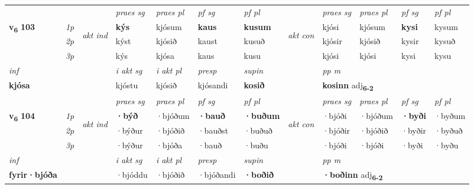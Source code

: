 \begin{longtable}[l]{X>{\footnotesize\itshape}llXXXXlXXXX}
 & &   & \textit{praes sg}  & \textit{praes pl}    & \textit{ pf sg} & \textit{pf pl} & & \textit{praes sg}  & \textit{praes pl}    & \textit{pf sg} & \textit{pf pl }  \\ \cmidrule{4-7} \cmidrule{9-12}
 \multirow{2}{*}{{{\textbf{v{\textsubscript{6}}} \Large{\textbf{103}}}}}  & 1p & \multirow{3}{*}{\begin{turn}{90}\textit{akt ind}\end{turn}} & \textbf{kýs} & kjósum & \textbf{kaus} & \textbf{kusum} & \multirow{3}{*}{\begin{turn}{90}\textit{akt con}\end{turn}} &kjósi & kjósum & \textbf{kysi} & kysum\\*
 & 2p &  &  kýst  & kjósið & kaust & kusuð & & kjósir & kjósið & kysir & kysuð \\*
 & 3p &  & kýs & kjósa & kaus & kusu & & kjósi & kjósi& kysi & kysu \\*
\cmidrule{4-7} \cmidrule{9-12}

   {\textit{inf}} & &  & \textit{i akt sg} & \textit{i akt pl}   & \textit{presp} & \textit{supin}  && \textit{pp m} \\*
  {\textbf{kjósa}} & && kjóstu  & kjósið   & kjósandi &  \textbf{kosið}  && \multicolumn{2}{l}{\textbf{kosinn} adj\textbf{\textsubscript{6-2}}} \\*

\midrule

 & &   & \textit{praes sg}  & \textit{praes pl}    & \textit{ pf sg} & \textit{pf pl} & & \textit{praes sg}  & \textit{praes pl}    & \textit{pf sg} & \textit{pf pl }  \\ \cmidrule{4-7} \cmidrule{9-12}
 \multirow{2}{*}{{{\textbf{v{\textsubscript{6}}} \Large{\textbf{104}}}}}  & 1p & \multirow{3}{*}{\begin{turn}{90}\textit{akt ind}\end{turn}} & \textbf{·býð} & ·bjóðum & \textbf{·bauð} & \textbf{·buðum} & \multirow{3}{*}{\begin{turn}{90}\textit{akt con}\end{turn}} &·bjóði & ·bjóðum & \textbf{·byði} & ·byðum\\*
 & 2p &  &  ·býður  & ·bjóðið & ·bauðst & ·buðuð & & ·bjóðir & ·bjóðið & ·byðir & ·byðuð \\*
 & 3p &  & ·býður & ·bjóða & ·bauð & ·buðu & & ·bjóði & ·bjóði& ·byði & ·byðu \\*
\cmidrule{4-7} \cmidrule{9-12}

   {\textit{inf}} & &  & \textit{i akt sg} & \textit{i akt pl}   & \textit{presp} & \textit{supin}  && \textit{pp m} \\*
  {\textbf{fyrir\allowbreak ·bjóða}} & && ·bjóddu  & ·bjóðið   & ·bjóðandi &  \textbf{·boðið}  && \multicolumn{2}{l}{\textbf{·boðinn} adj\textbf{\textsubscript{6-2}}} \\*


\end{longtable}
